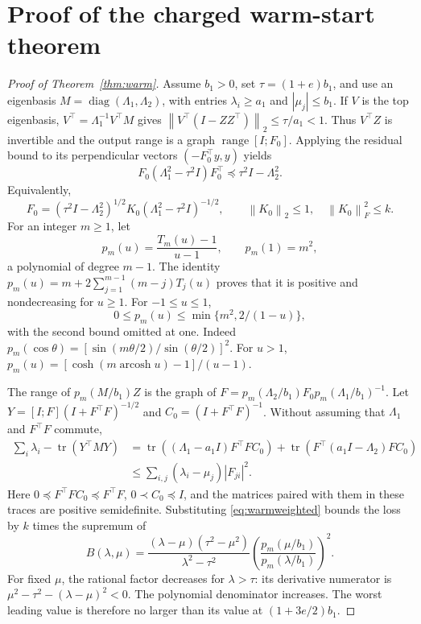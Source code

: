 \documentclass[11pt]{article}
\numberwithin{equation}{section}
\theoremstyle{remark}\newtheorem{remark}[theorem]{Remark}
\newcommand{\norm}[1]{\left\lVert #1\right\rVert}
\newcommand{\tr}{\operatorname{tr}}
\newcommand{\range}{\operatorname{range}}
\newcommand{\diag}{\operatorname{diag}}
\begin{document}
\section{Proof of the charged warm-start theorem}\label{app:warm}
\begin{proof}[Proof of Theorem~\ref{thm:warm}]
Assume $b_1>0$, set $\tau=(1+e)b_1$, and use an eigenbasis $M=\diag(\Lambda_1,\Lambda_2)$, with entries $\lambda_i\ge a_1$ and $|\mu_j|\le b_1$. If $V$ is the top eigenbasis, $V^\top=\Lambda_1^{-1}V^\top M$ gives
$\norm{V^\top(I-ZZ^\top)}_2\le\tau/a_1<1$. Thus $V^\top Z$ is invertible and the output range is a graph $\range[I;F_0]$. Applying the residual bound to its perpendicular vectors $(-F_0^\top y,y)$ yields
\begin{equation}\label{eq:warmweighted}
F_0(\Lambda_1^2-\tau^2I)F_0^\top\preceq\tau^2I-\Lambda_2^2.
\end{equation}
Equivalently,
\[
F_0=(\tau^2I-\Lambda_2^2)^{1/2}K_0(\Lambda_1^2-\tau^2I)^{-1/2},
\qquad \norm{K_0}_2\le1,\quad \norm{K_0}_F^2\le k.
\]
For an integer $m\ge1$, let
\[
p_m(u)=\frac{T_m(u)-1}{u-1},\qquad p_m(1)=m^2,
\]
a polynomial of degree $m-1$. The identity
$p_m(u)=m+2\sum_{j=1}^{m-1}(m-j)T_j(u)$ proves that it is positive and nondecreasing for $u\ge1$. For $-1\le u\le1$,
\begin{equation}\label{eq:fejerbound}
0\le p_m(u)\le\min\{m^2,2/(1-u)\},
\end{equation}
with the second bound omitted at one. Indeed
$p_m(\cos\theta)=[\sin(m\theta/2)/\sin(\theta/2)]^2$. For $u>1$,
$p_m(u)=[\cosh(m\operatorname{arcosh}u)-1]/(u-1)$.

The range of $p_m(M/b_1)Z$ is the graph of
$F=p_m(\Lambda_2/b_1)F_0p_m(\Lambda_1/b_1)^{-1}$.
Let $Y=[I;F](I+F^\top F)^{-1/2}$ and $C_0=(I+F^\top F)^{-1}$. Without assuming that $\Lambda_1$ and $F^\top F$ commute,
\begin{align*}
\sum_i\lambda_i-\tr(Y^\top MY)
&=\tr((\Lambda_1-a_1I)F^\top F C_0)
+\tr(F^\top(a_1I-\Lambda_2)F C_0)\\
&\le\sum_{i,j}(\lambda_i-\mu_j)|F_{ji}|^2.
\end{align*}
Here $0\preceq F^\top FC_0\preceq F^\top F$, $0\prec C_0\preceq I$, and the matrices paired with them in these traces are positive semidefinite. Substituting \eqref{eq:warmweighted} bounds the loss by $k$ times the supremum of
\begin{equation}\label{eq:warmcoefficient}
B(\lambda,\mu)=\frac{(\lambda-\mu)(\tau^2-\mu^2)}{\lambda^2-\tau^2}
\left(\frac{p_m(\mu/b_1)}{p_m(\lambda/b_1)}\right)^2.
\end{equation}
For fixed $\mu$, the rational factor decreases for $\lambda>\tau$: its derivative numerator is $\mu^2-\tau^2-(\lambda-\mu)^2<0$. The polynomial denominator increases. The worst leading value is therefore no larger than its value at $(1+3e/2)b_1$.


\end{proof}
\end{document}
